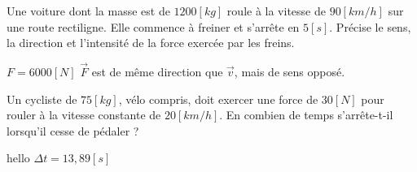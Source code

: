 \begin{exercise}
    Une voiture dont la masse est de \(1200[kg]\) roule à la vitesse de \(90[km/h]\) sur une route rectiligne. Elle commence à freiner et s'arrête en \(5[s]\).
    Précise le sens, la direction et l'intensité de la force exercée par les freins.
\end{exercise}
\begin{solution}
    \(F=6000[N]\)
    \(\vec{F}\) est de même direction que \(\vec{v}\), mais de sens opposé.
\end{solution}


\begin{exercise}
    Un cycliste de \(75[kg]\), vélo compris, doit exercer une force de \(30[N]\) pour rouler à la vitesse constante de \(20[km/h]\). En combien de temps s'arrête-t-il lorsqu'il cesse de pédaler ?
\end{exercise}
\begin{solution}hello
    \(\Delta t=13,89[s]\)
\end{solution}
